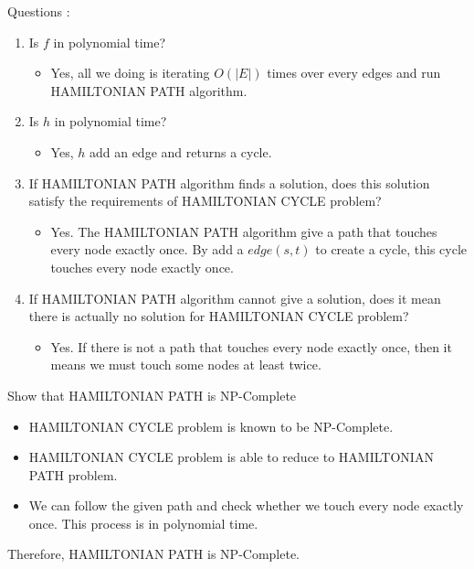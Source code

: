 \documentclass[12pt]{article}
\begin{document}
 Questions :
\begin{enumerate}
  \item Is \textbf{$f$} in polynomial time? 
	\begin{itemize}
	  \item Yes, all we doing is iterating $O(|E|)$ times over every edges and run HAMILTONIAN PATH algorithm. 
	\end{itemize}
  \item	Is \textbf{$h$} in polynomial time? 
	\begin{itemize}
	  \item Yes, $h$ add an edge and returns a cycle.
	\end{itemize}
  \item If HAMILTONIAN PATH algorithm finds a solution, does this solution satisfy the requirements of HAMILTONIAN CYCLE problem? 
	\begin{itemize}
	  \item Yes. The HAMILTONIAN PATH algorithm give a path that touches every node exactly once. 
		By add a $edge(s, t)$ to create a cycle, this cycle touches every node exactly once.
	\end{itemize}
  \item If HAMILTONIAN PATH algorithm cannot give a solution, does it mean there is actually no solution for HAMILTONIAN CYCLE problem? 
	\begin{itemize}
	  \item Yes. If there is not a path that touches every node exactly once, then it means we must touch some nodes at least twice. 
	\end{itemize}
\end{enumerate}

\noindent
Show that HAMILTONIAN PATH is NP-Complete
\begin{itemize}
  \item HAMILTONIAN CYCLE problem is known to be NP-Complete.
  \item	HAMILTONIAN CYCLE problem is able to reduce to HAMILTONIAN PATH problem.
  \item We can follow the given path and check whether we touch every node exactly once. This process is in polynomial time. 
\end{itemize}
\noindent
Therefore, HAMILTONIAN PATH is NP-Complete.
\end{document}
